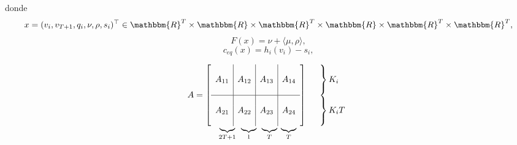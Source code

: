 \documentclass[a4paper,12pt]{report}
\newcommand{\la}{\langle}
\newcommand{\ra}{\rangle}
\newcommand{\RR}{\mathbbm{R}}
\begin{document}
donde
$$x=(v_i,v_{T+1},q_i,\nu,\rho,s_i)^\top\in\RR^T\times\RR\times\RR^T\times\RR\times\RR^T\times\RR^T,$$
$$F(x)=\nu+\la\mu,\rho\ra,$$
$$c_{eq}(x)=h_i(v_i)-s_i,$$




\[
\begin{array}{cl}
 A=\left[\begin{array}{c|c|c|c}
          & & & \\
	  A_{11}& A_{12}& A_{13}& A_{14} \\
    & & & \\
\hline    &  &  & \\
      A_{21}& A_{22}& A_{23}& A_{24} \\
    &  &  & 
         \end{array}
\right] & \begin{array}{l}
 \left. \vphantom{\begin{array}{c} c\\ A_1\\ c\end{array}} \right\} K_i\\
 \left. \vphantom{\begin{array}{c} c\\ A_1\\ c\end{array}} \right\} K_iT
 \end{array} \\[-0.3cm]
\hspace{.9cm}\underbrace{\phantom{A_{11}}}_{2T+1}\;\,\underbrace{\phantom{A_{12}}}_{1}\;\,\underbrace{\phantom{A_{13}}}_{T}\;\underbrace{\phantom{A_{14}}}_{T}&
\end{array}\]
\end{document}
